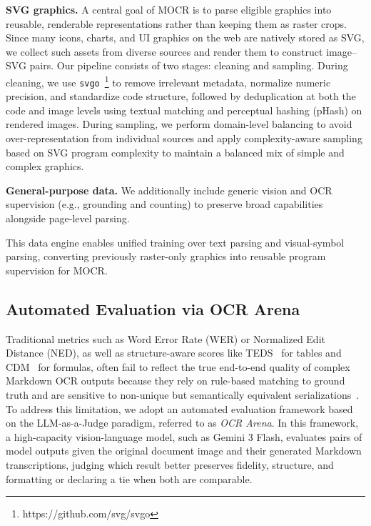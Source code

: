 \documentclass{article}
\begin{document}
    \textbf{SVG graphics.} A central goal of MOCR is to parse eligible graphics into reusable, renderable representations rather than keeping them as raster crops. Since many icons, charts, and UI graphics on the web are natively stored as SVG, we collect such assets from diverse sources and render them to construct image–SVG pairs. Our pipeline consists of two stages: cleaning and sampling. During cleaning, we use \texttt{svgo}~\footnote{https://github.com/svg/svgo} to remove irrelevant metadata, normalize numeric precision, and standardize code structure, followed by deduplication at both the code and image levels using textual matching and perceptual hashing (pHash) on rendered images. During sampling, we perform domain-level balancing to avoid over-representation from individual sources and apply complexity-aware sampling based on SVG program complexity to maintain a balanced mix of simple and complex graphics.

    \textbf{General-purpose data.} We additionally include generic vision and OCR supervision (e.g., grounding and counting) to preserve broad capabilities alongside page-level parsing.

    This data engine enables unified training over text parsing and visual-symbol parsing, converting previously raster-only graphics into reusable program supervision for MOCR.

\subsection{Automated Evaluation via OCR Arena}
\label{sec:elo}
Traditional metrics such as Word Error Rate (WER) or Normalized Edit Distance (NED), as well as structure-aware scores like TEDS~\cite{zhong2020image} for tables and CDM~\cite{wang2025image} for formulas, often fail to reflect the true end-to-end quality of complex Markdown OCR outputs because they rely on rule-based matching to ground truth and are sensitive to non-unique but semantically equivalent serializations~\cite{horn2025benchmarking}. To address this limitation, we adopt an automated evaluation framework based on the LLM-as-a-Judge paradigm, referred to as \textit{OCR Arena}. In this framework, a high-capacity vision-language model, such as Gemini 3 Flash, evaluates pairs of model outputs given the original document image and their generated Markdown transcriptions, judging which result better preserves fidelity, structure, and formatting or declaring a tie when both are comparable.
\end{document}
